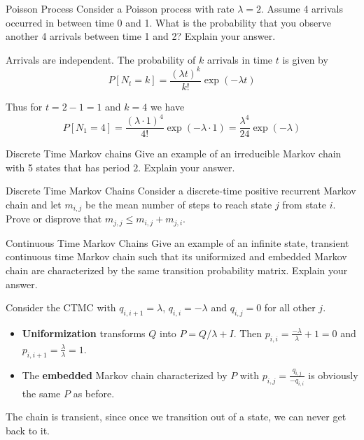 \begin{problem}{Poisson Process}
 Consider a Poisson process with rate $\lambda =2$. Assume 4 arrivals occurred in between time 0 and 1. What is the probability that you observe another 4 arrivals between time 1 and 2? Explain your answer.
\end{problem}
\begin{solution}
  Arrivals are independent. The probability of $k$ arrivals in time $t$ is given by
  \[
    P[N_t=k] = \frac{(\lambda t)^k}{k!}\exp(-\lambda t)
  \]

  Thus for $t=2-1=1$ and $k=4$ we have
  \[
    P[N_1=4] = \frac{(\lambda \cdot 1)^4}{4!}\exp(-\lambda \cdot 1) = \frac{\lambda^4}{24}\exp(-\lambda)
  \]
\end{solution}

\begin{problem}{Discrete Time Markov chains}
Give an example of an irreducible Markov chain
with 5 states that has period $2$. Explain your answer.
\end{problem}

\begin{problem}{Discrete Time Markov Chains}
Consider a discrete-time positive recurrent Markov chain and let $m_{i,j}$ be the mean number of steps to reach state $j$ from state $i$. Prove or disprove that $m_{j,j} \leq m_{i,j} + m_{j,i}$.
\end{problem}

\begin{problem}{Continuous Time Markov Chains}
Give an example of an infinite state, transient continuous time Markov chain such that its uniformized and embedded Markov chain are characterized by the same transition probability matrix. Explain your answer.
\end{problem}

\begin{solution}
  Consider the CTMC with $q_{i,i+1}=\lambda$, $q_{i,i}=-\lambda$ and $q_{i,j}=0$ for all other $j$.
  \begin{itemize}
    \item \textbf{Uniformization} transforms $Q$ into $P=Q/\lambda + I$. Then $p_{i,i} = \frac{-\lambda}{\lambda} + 1 = 0$ and $p_{i,i+1} = \frac{\lambda}{\lambda} = 1$.

    \item The \textbf{embedded} Markov chain characterized by $P$ with $p_{i,j}=\frac{q_{i,j}}{-q_{i,i}}$ is obviously the same $P$ as before.

  \end{itemize}
  The chain is transient, since once we transition out of a state, we can never get back to it.

\end{solution}

